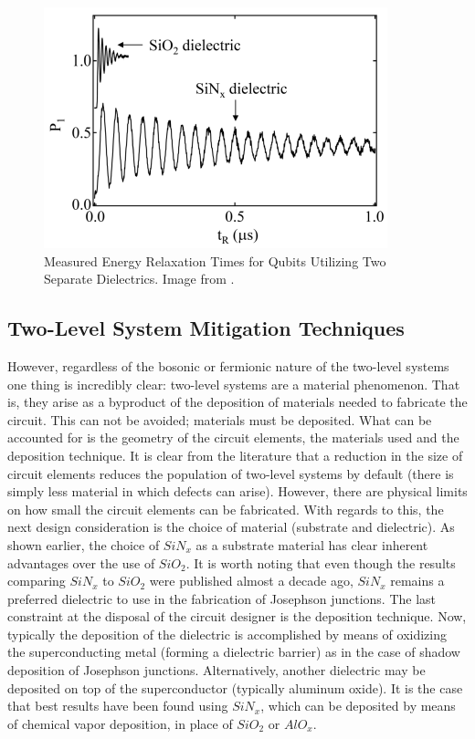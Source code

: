 \documentclass[aps,prl,reprint,groupedaddress]{revtex4-1}
\begin{document}
\begin{figure}%
\includegraphics[width=\columnwidth,natwidth=376,natheight=264]{../T1s.png}%
\caption{Measured Energy Relaxation Times for Qubits Utilizing Two Separate Dielectrics. Image from \cite{martinis_decoherence_2005}.}%
\label{T1s}%
\end{figure}

\subsection{Two-Level System Mitigation Techniques}
However, regardless of the bosonic or fermionic nature of the two-level systems one thing is incredibly clear: two-level systems are a material phenomenon. That is, they arise as a byproduct of the deposition of materials needed to fabricate the circuit. This can not be avoided; materials must be deposited. What can be accounted for is the geometry of the circuit elements, the materials used and the deposition technique. It is clear from the literature that a reduction in the size of circuit elements reduces the population of two-level systems by default (there is simply less material in which defects can arise). However, there are physical limits on how small the circuit elements can be fabricated. With regards to this, the next design consideration is the choice of material (substrate and dielectric). As shown earlier, the choice of $SiN_x$ as a substrate material has clear inherent advantages over the use of $SiO_2$. It is worth noting that even though the results comparing $SiN_x$ to $SiO_2$ were published almost a decade ago, $SiN_x$ remains a preferred dielectric to use in the fabrication of Josephson junctions. The last constraint at the disposal of the circuit designer is the deposition technique. Now, typically the deposition of the dielectric is accomplished by means of oxidizing the superconducting metal (forming a dielectric barrier) as in the case of shadow deposition of Josephson junctions. Alternatively, another dielectric may be deposited on top of the superconductor (typically aluminum oxide). It is the case that best results have been found using $SiN_x$, which can be deposited by means of chemical vapor deposition, in place of $SiO_2$ or $AlO_x$.
\end{document}
